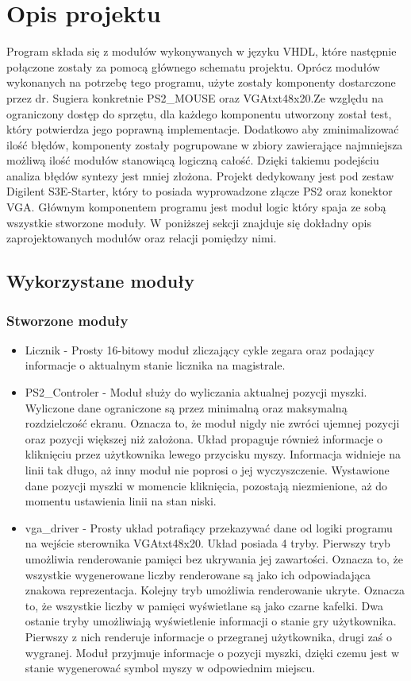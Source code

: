 \documentclass[polish,polish,a4paper]{article}
\begin{document}
\section{Opis projektu}
Program składa się z modułów wykonywanych w języku VHDL, które następnie połączone zostały za pomocą głównego schematu projektu. Oprócz modułów wykonanych na potrzebę tego programu, użyte zostały komponenty dostarczone przez dr. Sugiera konkretnie PS2\_MOUSE oraz VGAtxt48x20.Ze względu na ograniczony dostęp do sprzętu, dla każdego komponentu utworzony został test, który potwierdza jego poprawną implementacje. Dodatkowo aby zminimalizować ilość błędów, komponenty zostały pogrupowane w zbiory zawierające najmniejsza możliwą ilość modułów stanowiącą logiczną całość. Dzięki takiemu podejściu analiza błędów syntezy jest mniej złożona. Projekt dedykowany jest pod zestaw Digilent S3E-Starter, który to posiada wyprowadzone złącze PS2 oraz konektor VGA.
\newline
Głównym komponentem programu jest moduł logic który spaja ze sobą wszystkie stworzone moduły. W poniższej sekcji znajduje się dokładny opis zaprojektowanych modułów oraz relacji pomiędzy nimi. 
\newpage
\subsection{Wykorzystane moduły}
\subsubsection{Stworzone moduły}
\begin{itemize}
 \item Licznik - Prosty 16-bitowy moduł zliczający cykle zegara oraz podający informacje o aktualnym stanie licznika na magistrale.
 \item PS2\_Controler - Moduł służy do wyliczania aktualnej pozycji myszki. Wyliczone dane ograniczone są przez minimalną oraz maksymalną rozdzielczość ekranu. Oznacza to, że moduł nigdy nie zwróci ujemnej pozycji oraz pozycji większej niż założona. Układ propaguje również informacje o kliknięciu przez użytkownika lewego przycisku myszy. Informacja widnieje na linii tak długo, aż inny moduł nie poprosi o jej wyczyszczenie. Wystawione dane pozycji myszki w momencie kliknięcia, pozostają niezmienione, aż do momentu ustawienia linii na stan niski. 
 \item vga\_driver - Prosty układ potrafiący przekazywać dane od logiki programu na wejście sterownika VGAtxt48x20. Układ posiada 4 tryby. Pierwszy tryb umożliwia renderowanie pamięci bez ukrywania jej zawartości. Oznacza to, że wszystkie wygenerowane liczby renderowane są jako ich odpowiadająca znakowa reprezentacja. Kolejny tryb umożliwia renderowanie ukryte. Oznacza to, że wszystkie liczby w pamięci wyświetlane są jako czarne kafelki. Dwa ostanie tryby umożliwiają wyświetlenie informacji o stanie gry użytkownika. Pierwszy z nich renderuje informacje o przegranej użytkownika, drugi zaś o wygranej. Moduł przyjmuje informacje o pozycji myszki, dzięki czemu jest w stanie wygenerować symbol myszy w odpowiednim miejscu.     
\end{itemize}
\end{document}
